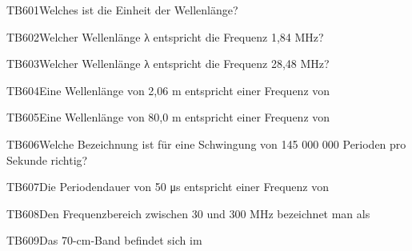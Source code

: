 \begin{question}{TB601}{Welches ist die Einheit der Wellenlänge?}
\end{question}

\begin{question}{TB602}{Welcher Wellenlänge λ entspricht die Frequenz 1,84 MHz?}
\end{question}

\begin{question}{TB603}{Welcher Wellenlänge λ entspricht die Frequenz 28,48 MHz?}
\end{question}

\begin{question}{TB604}{Eine Wellenlänge von 2,06 m entspricht einer Frequenz von}
\end{question}

\begin{question}{TB605}{Eine Wellenlänge von 80,0 m entspricht einer Frequenz von}
\end{question}

\begin{question}{TB606}{Welche Bezeichnung ist für eine Schwingung von 145 000 000 Perioden pro Sekunde richtig?}
\end{question}

\begin{question}{TB607}{Die Periodendauer von 50 μs entspricht einer Frequenz von}
\end{question}

\begin{question}{TB608}{Den Frequenzbereich zwischen 30 und 300 MHz bezeichnet man als}
\end{question}

\begin{question}{TB609}{Das 70-cm-Band befindet sich im}
\end{question}

